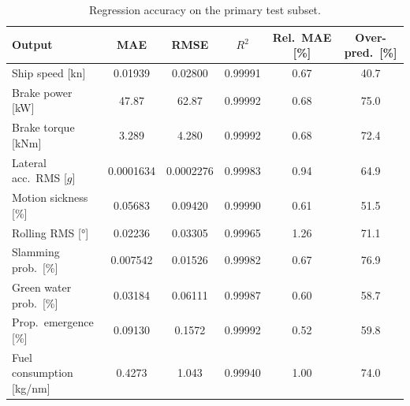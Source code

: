 \documentclass[final,5p,times,twocolumn,numbers]{elsarticle}
\begin{document}
\begin{table}[ht]
\centering
\caption{Regression accuracy on the primary test subset.}
\label{tab:regression}
\footnotesize
\setlength{\tabcolsep}{7pt}
\begin{tabular}{
  l
  S[table-format=2.7]
  S[table-format=2.7]
  S[table-format=1.5]
  S[table-format=1.2]
  S[table-format=2.1]
}
\toprule
Output & {MAE} & {RMSE} & {$R^2$} & {Rel.\ MAE [\%]} & {Over-pred.\ [\%]} \\
\midrule
Ship speed [\unit{kn}]          & 0.01939   & 0.02800   & 0.99991 & 0.67 & 40.7 \\
Brake power [\unit{kW}]         & 47.87     & 62.87     & 0.99992 & 0.68 & 75.0 \\
Brake torque [\unit{kNm}]       & 3.289     & 4.280     & 0.99992 & 0.68 & 72.4 \\
Lateral acc.\ RMS [$g$]         & 0.0001634 & 0.0002276 & 0.99983 & 0.94 & 64.9 \\
Motion sickness [\%]            & 0.05683   & 0.09420   & 0.99990 & 0.61 & 51.5 \\
Rolling RMS [\unit{\degree}]    & 0.02236   & 0.03305   & 0.99965 & 1.26 & 71.1 \\
Slamming prob.\ [\%]            & 0.007542  & 0.01526   & 0.99982 & 0.67 & 76.9 \\
Green water prob.\ [\%]         & 0.03184   & 0.06111   & 0.99987 & 0.60 & 58.7 \\
Prop.\ emergence [\%]           & 0.09130   & 0.1572    & 0.99992 & 0.52 & 59.8 \\
Fuel consumption [\unit{kg/nm}] & 0.4273    & 1.043     & 0.99940 & 1.00 & 74.0 \\
\bottomrule
\end{tabular}
\end{table}
\end{document}
